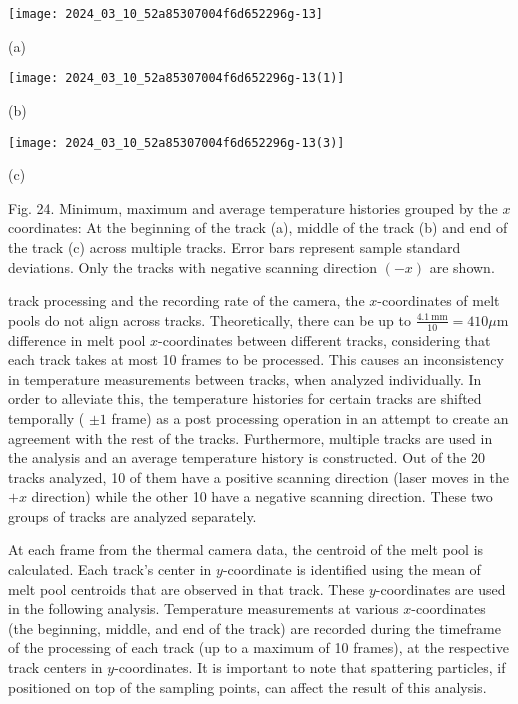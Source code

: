 \documentclass[10pt]{article}
\begin{document}
\begin{center}
\texttt{[image: 2024\_03\_10\_52a85307004f6d652296g-13]}
\end{center}

(a)

\begin{center}
\texttt{[image: 2024\_03\_10\_52a85307004f6d652296g-13(1)]}
\end{center}

(b)

\begin{center}
\texttt{[image: 2024\_03\_10\_52a85307004f6d652296g-13(3)]}
\end{center}

(c)

Fig. 24. Minimum, maximum and average temperature histories grouped by the $x$ coordinates: At the beginning of the track (a), middle of the track (b) and end of the track (c) across multiple tracks. Error bars represent sample standard deviations. Only the tracks with negative scanning direction $(-x)$ are shown.

track processing and the recording rate of the camera, the $x$-coordinates of melt pools do not align across tracks. Theoretically, there can be up to $\frac{4.1 \mathrm{~mm}}{10}=410 \mu \mathrm{m}$ difference in melt pool $x$-coordinates between different tracks, considering that each track takes at most 10 frames to be processed. This causes an inconsistency in temperature measurements between tracks, when analyzed individually. In order to alleviate this, the temperature histories for certain tracks are shifted temporally ( $\pm 1$ frame) as a post processing operation in an attempt to create an agreement with the rest of the tracks. Furthermore, multiple tracks are used in the analysis and an average temperature history is constructed. Out of the 20 tracks analyzed, 10 of them have a positive scanning direction (laser moves in the $+x$ direction) while the other 10 have a negative scanning direction. These two groups of tracks are analyzed separately.

At each frame from the thermal camera data, the centroid of the melt pool is calculated. Each track's center in $y$-coordinate is identified using the mean of melt pool centroids that are observed in that track. These $y$-coordinates are used in the following analysis. Temperature measurements at various $x$-coordinates (the beginning, middle, and end of the track) are recorded during the timeframe of the processing of each track (up to a maximum of 10 frames), at the respective track centers in $y$-coordinates. It is important to note that spattering particles, if positioned on top of the sampling points, can affect the result of this analysis.
\end{document}
